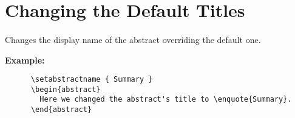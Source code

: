 \section{Changing the Default Titles}
  \label{sec:Changing_the_Default_Titles}

  \paragraph{\texttt{}}
    Changes the display name of the abstract overriding the default one.
    
    \textbf{Example:}
    \begin{verbatim}
      \setabstractname { Summary }
      \begin{abstract}
        Here we changed the abstract's title to \enquote{Summary}.
      \end{abstract}
    \end{verbatim}

    \begin{abstract}
      Here we changed the abstract's title to \enquote{Summary}.
    \end{abstract}